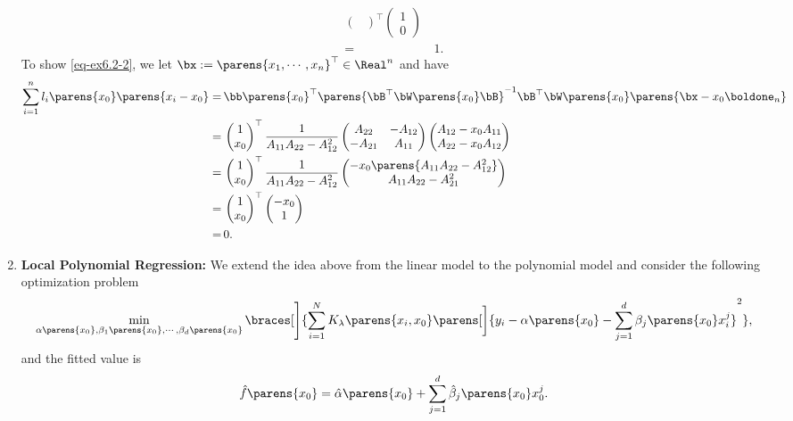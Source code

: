 \documentclass[12pt]{article}
\begin{document}
\begin{enumerate}[label=\textbf{\arabic*.}]
\begin{align*}
\begin{pmatrix}
		\end{pmatrix}^\top \begin{pmatrix}
			1 \\ 
			0
		\end{pmatrix} \\ 
		= & \, 1. 
	\end{align*}
	To show \eqref{eq-ex6.2-2}, we let $\bx := \parens{x_1, \cdots, x_n}^\top \in \Real^n$ and have 
	\begin{align*}
		\sum_{i=1}^n l_i \parens{x_0} \parens{x_i - x_0} = & \, \bb \parens{x_0}^\top \parens{\bB^\top \bW \parens{x_0} \bB}^{-1} \bB^\top \bW \parens{x_0} \parens{\bx - x_0 \boldone_n} \\ 
		= & \, \begin{pmatrix}
			1 \\ x_0
		\end{pmatrix}^\top \frac{1}{A_{11} A_{22} - A_{12}^2} \begin{pmatrix}
			A_{22} & -A_{12} \\ -A_{21} & A_{11}
		\end{pmatrix} \begin{pmatrix}
			A_{12} - x_0 A_{11} \\ A_{22} - x_0 A_{12}
		\end{pmatrix} \\ 
		= & \, \begin{pmatrix}
			1 \\ x_0
		\end{pmatrix}^\top \frac{1}{A_{11} A_{22} - A_{12}^2} \begin{pmatrix}
			- x_0 \parens{A_{11} A_{22} - A_{12}^2} \\ 
			A_{11} A_{22} - A_{21}^2 
		\end{pmatrix} \\ 
		= & \, \begin{pmatrix}
			1 \\ x_0
		\end{pmatrix}^\top \begin{pmatrix}
			- x_0 \\ 1
		\end{pmatrix} \\ 
		= & \, 0. 
	\end{align*}
	
	\item \textbf{Local Polynomial Regression:} We extend the idea above from the linear model to the polynomial model and consider the following optimization problem 
	\begin{align*}
		\min_{\alpha\parens{x_0}, \beta_1 \parens{x_0}, \cdots, \beta_d \parens{x_0}} \braces[\Bigg]{\sum_{i=1}^N K_\lambda \parens{x_i, x_0} \parens[\bigg]{ y_i - \alpha \parens{x_0} - \sum_{j=1}^d \beta_j \parens{x_0} x_i^j}^2}, 
	\end{align*}
	and the fitted value is 
	\begin{align*}
		\hat{f} \parens{x_0} = \hat{\alpha} \parens{x_0} + \sum_{j=1}^d \hat{\beta}_j\parens{x_0} x_0^j. 
	\end{align*}
	

\end{enumerate}
\end{document}
